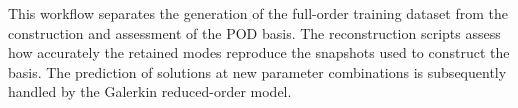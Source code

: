 This workflow separates the generation of the full-order
training dataset from the construction and assessment of
the POD basis. The reconstruction scripts assess how
accurately the retained modes reproduce the snapshots
used to construct the basis. The prediction of solutions
at new parameter combinations is subsequently handled by
the Galerkin reduced-order model.